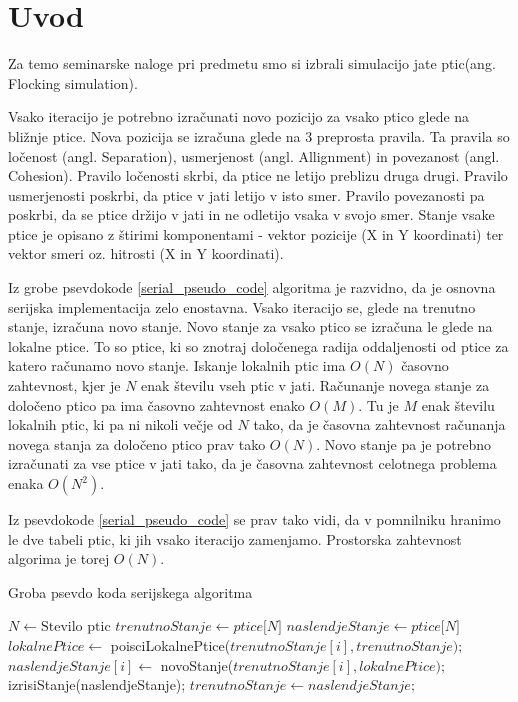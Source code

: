 \documentclass[a4paper, 12pt]{book}
\newcommand{\clearemptydoublepage}{\newpage{\pagestyle{empty}\cleardoublepage}}
\begin{document}
\clearemptydoublepage



\mainmatter
\setcounter{page}{1}
\pagestyle{fancy}

\chapter{Uvod}
Za temo seminarske naloge pri predmetu smo si izbrali simulacijo jate ptic(ang. Flocking simulation).

Vsako iteracijo je potrebno izračunati novo pozicijo za vsako ptico glede na bližnje ptice. Nova pozicija se izračuna glede na 3 preprosta pravila. Ta pravila so ločenost (angl. Separation), usmerjenost (angl. Allignment) in povezanost (angl. Cohesion). Pravilo ločenosti skrbi, da ptice ne letijo preblizu druga drugi. Pravilo usmerjenosti poskrbi, da ptice v jati letijo v isto smer. Pravilo povezanosti pa poskrbi, da se ptice držijo v jati in ne odletijo vsaka v svojo smer. Stanje vsake ptice je opisano z štirimi komponentami - vektor pozicije (X in Y koordinati) ter vektor smeri oz. hitrosti (X in Y koordinati). 

Iz grobe psevdokode \ref{serial_pseudo_code} algoritma je razvidno, da je osnovna serijska implementacija zelo enostavna. Vsako iteracijo se, glede na trenutno stanje, izračuna novo stanje. Novo stanje za vsako ptico se izračuna le glede na lokalne ptice. To so ptice, ki so znotraj določenega radija oddaljenosti od ptice za katero računamo novo stanje. Iskanje lokalnih ptic ima $O(N)$ časovno zahtevnost, kjer je $N$ enak številu vseh ptic v jati. Računanje novega stanje za določeno ptico pa ima časovno zahtevnost enako $O(M)$. Tu je $M$ enak številu lokalnih ptic, ki pa ni nikoli večje od $N$ tako, da je časovna zahtevnost računanja novega stanja za določeno ptico prav tako $O(N)$. Novo stanje pa je potrebno izračunati za vse ptice v jati tako, da je časovna zahtevnost celotnega problema enaka $O(N^2)$. 

Iz psevdokode \ref{serial_pseudo_code} se prav tako vidi, da v pomnilniku hranimo le dve tabeli ptic, ki jih vsako iteracijo zamenjamo. Prostorska zahtevnost algorima je torej $O(N)$.
\begin{algorithm}
\caption{Groba psevdo koda serijskega algoritma}\label{serial_pseudo_code}
\begin{algorithmic}[1]
\State $N \gets \text{Stevilo ptic}$
\State $trenutnoStanje \gets \textit{ptice[N]}$
\State $naslendjeStanje \gets \textit{ptice[N]}$
\Loop
{}
\State $lokalnePtice \gets$ poisciLokalnePtice($trenutnoStanje[i], trenutnoStanje);$
\State $naslendjeStanje[i] \gets$ novoStanje($trenutnoStanje[i], lokalnePtice);$
\EndFor
\State izrisiStanje(naslendjeStanje);
\State $trenutnoStanje \gets naslendjeStanje;$
\EndLoop
\end{algorithmic}
\end{algorithm}
\end{document}
